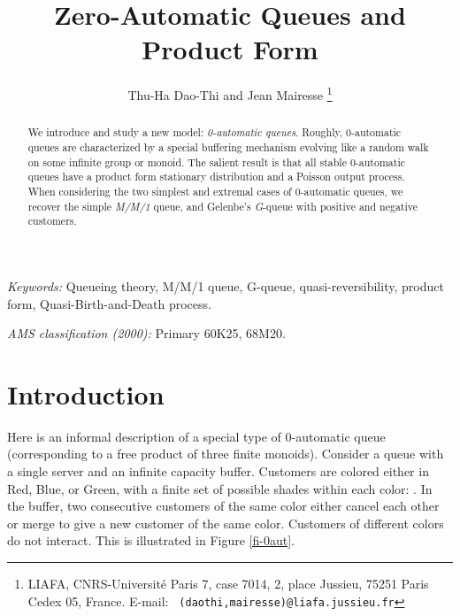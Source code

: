 \documentclass[11pt,a4paper]{article}
\theoremstyle{remark}
\begin{document}
\sloppy

\title{\bf Zero-Automatic Queues and Product Form}

\author{Thu-Ha {\sc Dao-Thi} and  Jean {\sc Mairesse}
\thanks{LIAFA, CNRS-Universit\'e Paris 7, case
    7014, 2, place Jussieu, 75251 Paris Cedex 05, France. E-mail: {\tt
      (daothi,mairesse)@liafa.jussieu.fr}}}

\maketitle



\begin{abstract}
We introduce and study a new model: {\em 0-automatic
  queues}. Roughly, 0-automatic queues are
characterized by a special buffering mechanism evolving like a
random walk on some infinite group or monoid. The salient result
is that all stable 0-automatic queues have a product form stationary
  distribution and a Poisson output process. When
considering the two simplest and extremal cases of 0-automatic
queues, we recover the simple \emph{M/M/1} queue, and Gelenbe's
\emph{G}-queue with positive and negative customers.
\end{abstract}



\textsl{Keywords:} Queueing theory, M/M/1 queue, G-queue,
quasi-reversibility, product form, Quasi-Birth-and-Death process.

\smallskip

\textsl{AMS classification (2000):} Primary 60K25, 68M20.











\section{Introduction}

Here is an informal description of a special type of 0-automatic
queue (corresponding to a free product of three finite
monoids). Consider a queue with a single server and an infinite
capacity buffer.
Customers are colored either in Red, Blue, or
Green, with a finite set of possible shades within each color:
.
In the buffer, two consecutive customers of the
same color either cancel each other or merge to give a new
customer of the same color. Customers of different colors do not
interact.
This is illustrated in Figure \ref{fi-0aut}.
\end{document}
